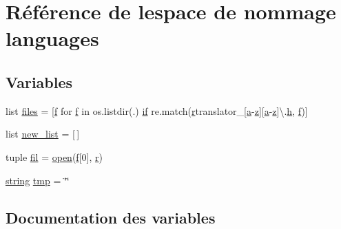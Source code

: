 \hypertarget{namespacelanguages}{}\section{Référence de l\textquotesingle{}espace de nommage languages}
\label{namespacelanguages}
\subsection*{Variables}
\begin{DoxyCompactItemize}
\item 
list \hyperlink{namespacelanguages_ab2362f8df797056a2dedc16b7ac63d2a}{files} = \mbox{[}\hyperlink{060__command__switch_8tcl_af6830d2c644b45088ea8f1f74a46b778}{f} for \hyperlink{060__command__switch_8tcl_af6830d2c644b45088ea8f1f74a46b778}{f} in os.\+listdir(\textquotesingle{}.\textquotesingle{}) \hyperlink{xmlcode_8cpp_ad4a65b873df5c05570846b5413b41dfd}{if} re.\+match(\hyperlink{060__command__switch_8tcl_a0a0bd3dc69dd06934c4e6362155e0ace}{r}\textquotesingle{}translator\+\_\+\mbox{[}\hyperlink{060__command__switch_8tcl_ab08ae027fc5777bc4f0629f1b60b35db}{a}-\/\hyperlink{058__bracket__recursion_8tcl_a25ed1bcb423b0b7200f485fc5ff71c8e}{z}\mbox{]}\mbox{[}\hyperlink{060__command__switch_8tcl_ab08ae027fc5777bc4f0629f1b60b35db}{a}-\/\hyperlink{058__bracket__recursion_8tcl_a25ed1bcb423b0b7200f485fc5ff71c8e}{z}\mbox{]}\textbackslash{}.\hyperlink{060__command__switch_8tcl_af96fd0966e32a310a0778d2e5c357700}{h}\textquotesingle{}, \hyperlink{060__command__switch_8tcl_af6830d2c644b45088ea8f1f74a46b778}{f})\mbox{]}
\item 
list \hyperlink{namespacelanguages_a08f1c639dc6ba6c9c0ded38c06a2353a}{new\+\_\+list} = \mbox{[}$\,$\mbox{]}
\item 
tuple \hyperlink{namespacelanguages_a77787bb82214106405ec90ddffd2e038}{fil} = \hyperlink{structcmd_8h_a2c4414339f388561554c2deab11a1a07}{open}(\hyperlink{060__command__switch_8tcl_af6830d2c644b45088ea8f1f74a46b778}{f}\mbox{[}0\mbox{]}, \textquotesingle{}\hyperlink{060__command__switch_8tcl_a0a0bd3dc69dd06934c4e6362155e0ace}{r}\textquotesingle{})
\item 
\hyperlink{tclscanner_8cpp_a3b18665bed369c4cf583afc1b05f583a}{string} \hyperlink{namespacelanguages_a31d430dd93511d50089061f81f32c31d}{tmp} = \char`\"{}\char`\"{}
\end{DoxyCompactItemize}


\subsection{Documentation des variables}
\hypertarget{namespacelanguages_a77787bb82214106405ec90ddffd2e038}{}
